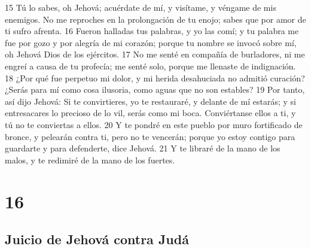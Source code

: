 15 Tú lo sabes, oh Jehová; acuérdate de mí, y visítame, y véngame de mis enemigos. No me reproches en la prolongación de tu enojo; sabes que por amor de ti sufro afrenta.
16 Fueron halladas tus palabras, y yo las comí; y tu palabra me fue por gozo y por alegría de mi corazón; porque tu nombre se invocó sobre mí, oh Jehová Dios de los ejércitos.
17 No me senté en compañía de burladores, ni me engreí a causa de tu profecía; me senté solo, porque me llenaste de indignación.
18 ¿Por qué fue perpetuo mi dolor, y mi herida desahuciada no admitió curación? ¿Serás para mí como cosa ilusoria, como aguas que no son estables?
19 Por tanto, así dijo Jehová: Si te convirtieres, yo te restauraré, y delante de mí estarás; y si entresacares lo precioso de lo vil, serás como mi boca. Conviértanse ellos a ti, y tú no te conviertas a ellos.
20 Y te pondré en este pueblo por muro fortificado de bronce, y pelearán contra ti, pero no te vencerán; porque yo estoy contigo para guardarte y para defenderte, dice Jehová.
21 Y te libraré de la mano de los malos, y te redimiré de la mano de los fuertes.

\chapter{16}

\section*{Juicio de Jehová contra Judá}

